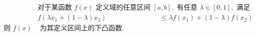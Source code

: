 \documentclass[preview]{standalone}
\begin{document}
\begin{align*}
& \text{对于某函数 } f(x) \text{ 定义域的任意区间 } [a, b], \text{ 有任意 } \lambda \in [0, 1], \text{ 满足} \\ & f(\lambda x_1 + (1 - \lambda) x_2) &\leq \lambda f(x_1) + (1 - \lambda) f(x_2) \\ \text{则 } f(x) &\text{ 为其定义区间上的下凸函数.}
\end{align*}
\end{document}
